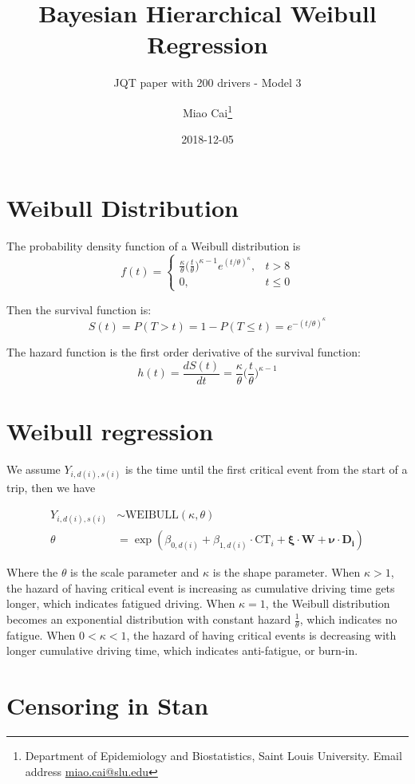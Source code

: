 \documentclass[]{article}
\title{Bayesian Hierarchical Weibull Regression}
\subtitle{JQT paper with 200 drivers - Model 3}
\author{Miao Cai\footnote{Department of Epidemiology and Biostatistics, Saint
  Louis University. Email address \url{miao.cai@slu.edu}}}
\date{2018-12-05}
\begin{document}
\maketitle

\section{Weibull Distribution}\label{weibull-distribution}

The probability density function of a Weibull distribution is \[
f(t) = \begin{cases}
\frac{\kappa}{\theta}\Big(\frac{t}{\theta}\Big)^{\kappa - 1}e^{(t/\theta)^\kappa}, & t>8 \\
0, & t\leq 0
\end{cases}
\]

Then the survival function is: \[
S(t) = P(T > t) = 1 - P(T \leq t) = e^{-(t/\theta)^\kappa}
\]

The hazard function is the first order derivative of the survival
function: \[
h(t) = \frac{dS(t)}{dt} = \frac{\kappa}{\theta}\Big(\frac{t}{\theta}\Big)^{\kappa - 1}
\]

\section{Weibull regression}\label{weibull-regression}

We assume \(Y_{i, d(i), s(i)}\) is the time until the first critical
event from the start of a trip, then we have

\begin{align*}
Y_{i, d(i), s(i)} & \sim \text{WEIBULL}(\kappa, \theta) \\
\theta & = \exp(\beta_{0, d(i)} + \beta_{1, d(i)} \cdot \text{CT}_i + \mathbf{\xi} \cdot \mathbf{W} + \mathbf{\nu} \cdot \mathbf{D_i})
\end{align*}

Where the \(\theta\) is the scale parameter and \(\kappa\) is the shape
parameter. When \(\kappa > 1\), the hazard of having critical event is
increasing as cumulative driving time gets longer, which indicates
fatigued driving. When \(\kappa = 1\), the Weibull distribution becomes
an exponential distribution with constant hazard \(\frac{1}{\theta}\),
which indicates no fatigue. When \(0 < \kappa < 1\), the hazard of
having critical events is decreasing with longer cumulative driving
time, which indicates anti-fatigue, or burn-in.

\section{Censoring in Stan}\label{censoring-in-stan}
\end{document}
